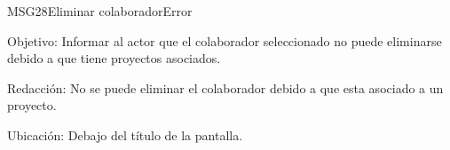 \begin{mensaje}{MSG28}{Eliminar colaborador}{Error}
	\item [Objetivo:] Informar al actor que el colaborador seleccionado no puede eliminarse debido a que tiene proyectos asociados.
	\item[Redacción:] No se puede eliminar el colaborador debido a que esta asociado a un proyecto.
	\item [Ubicación:] Debajo del título de la pantalla.
\end{mensaje}